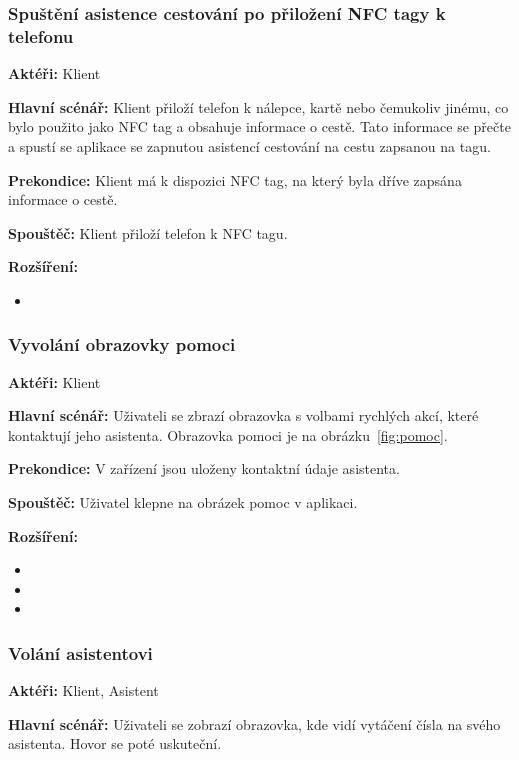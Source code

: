 \documentclass{article}
\newcommand{\usecase}[2]{\subsubsection{#1}\label{#2}}
\begin{document}
\usecase{Spuštění asistence cestování po přiložení NFC tagy k telefonu}{prilozeninfc}
\textbf{Aktéři:} Klient

\vspace{0.1cm}
\noindent
\textbf{Hlavní scénář:} Klient přiloží telefon k nálepce, kartě nebo čemukoliv jinému, co bylo použito
jako NFC tag a obsahuje informace o cestě. Tato informace se přečte a spustí se aplikace se zapnutou
asistencí cestování na cestu zapsanou na tagu.

\vspace{0.1cm}
\noindent
\textbf{Prekondice:} Klient má k dispozici NFC tag, na který byla dříve zapsána informace o cestě.

\vspace{0.1cm}
\noindent
\textbf{Spouštěč:} Klient přiloží telefon k NFC tagu.

\vspace{0.1cm}
\noindent
\textbf{Rozšíření:}
\begin{itemize}
  \item {}
\end{itemize}

\usecase{Vyvolání obrazovky pomoci}{pomoc}
\textbf{Aktéři:} Klient

\vspace{0.1cm}
\noindent
\textbf{Hlavní scénář:} Uživateli se zbrazí obrazovka s volbami rychlých akcí,
které kontaktují jeho asistenta. Obrazovka pomoci je na obrázku~\ref{fig:pomoc}.

\vspace{0.1cm}
\noindent
\textbf{Prekondice:} V zařízení jsou uloženy kontaktní údaje asistenta.

\vspace{0.1cm}
\noindent
\textbf{Spouštěč:} Uživatel klepne na obrázek pomoc v aplikaci.

\vspace{0.1cm}
\noindent
\textbf{Rozšíření:}
\begin{itemize}
  \item {}
  \item {}
  \item {}
\end{itemize}



\usecase{Volání asistentovi}{pomocvolani}
\textbf{Aktéři:} Klient, Asistent

\vspace{0.1cm}
\noindent
\textbf{Hlavní scénář:} Uživateli se zobrazí obrazovka, kde vidí vytáčení čísla na svého asistenta.
Hovor se poté uskuteční.
\end{document}
